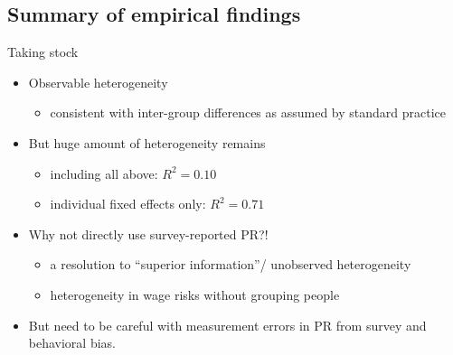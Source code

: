 \documentclass{beamer}
\begin{document}
\subsection{Summary of empirical findings}
\begin{frame}{Taking stock}
	
	\begin{itemize}
		\item Observable heterogeneity 
		\begin{itemize}
			\item  consistent with inter-group differences as assumed by standard practice
		\end{itemize}
		\pause
		\item But huge amount of heterogeneity remains
		\begin{itemize}
			\item including all above: $R^2 =0.10$
			\item individual fixed effects only: $R^2=0.71$
		\end{itemize}
		\pause
		\item Why not directly use survey-reported PR?!
		\begin{itemize}
			\item a resolution to ``superior information''/ unobserved heterogeneity
			\item heterogeneity in wage risks without grouping people
		\end{itemize}
	\pause 
	\item But need to be careful with measurement errors in PR from survey and behavioral bias. 
	\end{itemize} 
\end{frame}
\end{document}
